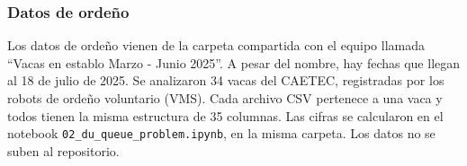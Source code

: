 \subsubsection*{Datos de ordeño}

Los datos de ordeño vienen de la carpeta compartida con el equipo llamada ``Vacas en establo Marzo - Junio 2025''. A pesar del nombre, hay fechas que llegan al 18 de julio de 2025. Se analizaron 34 vacas del CAETEC, registradas por los robots de ordeño voluntario (VMS). Cada archivo CSV pertenece a una vaca y todos tienen la misma estructura de 35 columnas. Las cifras se calcularon en el notebook \nolinkurl{02_du_queue_problem.ipynb}, en la misma carpeta. Los datos no se suben al repositorio.
